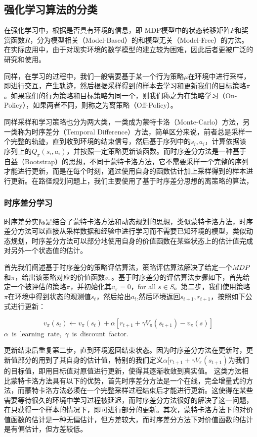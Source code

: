 \documentclass{standalone}
\begin{document}
\subsection{强化学习算法的分类}
在强化学习中，根据是否具有环境的信息，即 MDP模型中的状态转移矩阵$P$和奖赏函数$R$，分为模型相关（Model-Based）的和模型无关（Model-Free）的方法。在实际应用中，由于对现实环境的数学模型的建立较为困难，因此后者更被广泛的研究和使用。\par
同样，在学习的过程中，我们一般需要基于某一个行为策略$\mu$在环境中进行采样，即进行交互，产生轨迹，然后根据采样得到的样本去学习和更新我们的目标策略$\pi$。如果我们的行为策略和目标策略为同一个，则我们称之为在策略学习（On-Policy），如果两者不同，则称之为离策略（Off-Policy）。\par
同样采样和学习策略也分为两大类，一类成为蒙特卡洛（Monte-Carlo）方法，另一类称为时序差分（Temporal Difference）方法，简单区分来说，前者总是采样一个完整的轨迹，直到收到环境的结束信号，然后基于序列中的$s_i, a_i$，计算依据该序列上的$Q_{\pi}(s_i, a_i)$，并按照一定策略更新该函数。而时序差分方法是一种基于自益（Bootstrap）的思想，不同于蒙特卡洛方法，它不需要采样一个完整的序列才能进行更新，而是在每个时刻，通过使用自身的函数估计加上采样得到的样本进行更新。在路径规划问题上，我们主要使用了基于时序差分思想的离策略的算法，
\subsubsection{时序差分学习}
时序差分实际是结合了蒙特卡洛方法和动态规划的思想，类似蒙特卡洛方法，时序差分方法可以直接从采样数据和经验中进行学习而不需要已知环境的模型，类似动态规划，时序差分方法可以部分地使用自身的价值函数在某些状态上的估计值完成对另外一个状态值的估计。\par
首先我们阐述基于时序差分的策略评估算法，策略评估算法解决了给定一个$MDP$和$\pi$，给出该策略对应的价值函数$v_{\pi}$。基于时序差分的评估算法步骤如下，首先给定一个被评估的策略$\pi$，并初始化其$v_{\pi} = 0$，for all $s \in S$。第二步，我们使用策略$\pi$在环境中得到状态的观测值$s_t$，然后给出$a_t$,然后环境返回$s_{t+1}, r_{t+1}$，按照如下公式进行更新：
\begin{center}
    \begin{equation}
        v_{\pi}(s_t) \leftarrow v_{\pi}(s_t) + \alpha[r_{t+1} + \gamma V_{\pi}(s_{t+1}) - v_{\pi}(s)]
    \end{equation}
    \mbox{$\alpha$ is learning rate, $\gamma$ is discount factor.}
\end{center}
更新结束后重复第二步，直到环境返回结束状态。因为时序差分方法在更新时，更新值部分的用到了其自身的估计值，特别的我们定义$\alpha[r_{t+1} + \gamma V_{\pi}(s_{t+1})$为我们的目标值，即用目标值对原值进行更新，使得其逐渐收敛到真实值。
这类方法相比蒙特卡洛方法具有以下的优势，首先时序差分方法是一个在线，完全增量式的方法，而蒙特卡洛方法必须在一个完整采样过程结束后才能进行更新。这使得在某些需要等待很久的环境中学习过程被延迟，而时序差分方法很好的解决了这一问题，在只获得一个样本的情况下，即可进行部分的更新。其次，蒙特卡洛方法下的对价值函数的估计是一种无偏估计，但方差较大，而时序差分方法下对价值函数的估计是有偏估计，但方差较低。
\end{document}
